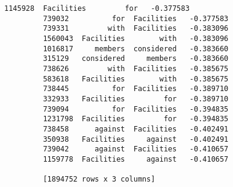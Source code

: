 \documentclass[11pt]{article}
\begin{document}
\begin{Verbatim}[commandchars=\\\{\}]
         1145928  Facilities         for   -0.377583
         739032          for  Facilities   -0.377583
         739331         with  Facilities   -0.383096
         1560043  Facilities        with   -0.383096
         1016817     members  considered   -0.383660
         315129   considered     members   -0.383660
         738626         with  Facilities   -0.385675
         583618   Facilities        with   -0.385675
         738445          for  Facilities   -0.389710
         332933   Facilities         for   -0.389710
         739094          for  Facilities   -0.394835
         1231798  Facilities         for   -0.394835
         738458      against  Facilities   -0.402491
         350938   Facilities     against   -0.402491
         739042      against  Facilities   -0.410657
         1159778  Facilities     against   -0.410657
         
         [1894752 rows x 3 columns]
\end{Verbatim}
            

    
    
    
    
\end{document}
